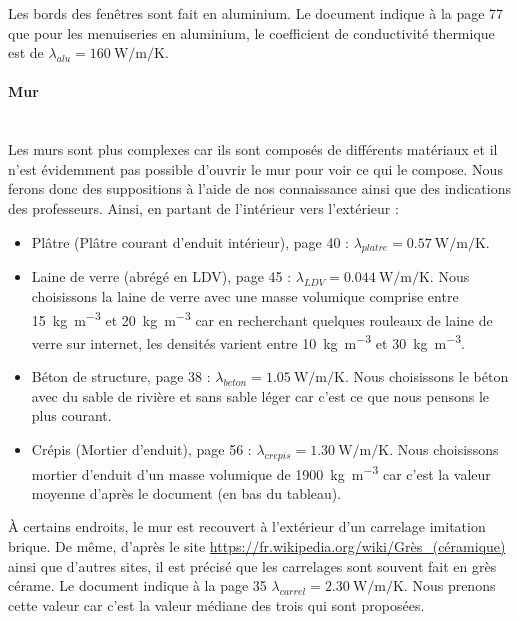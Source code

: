 \documentclass[12pt, a4paper]{article}
\newcommand{\lambdaAlu}{\ensuremath{\lambda_{alu}}}
\newcommand{\lambdaPlatre}{\ensuremath{\lambda_{platre}}}
\newcommand{\lambdaLDV}{\ensuremath{\lambda_{LDV}}}
\newcommand{\lambdaBeton}{\ensuremath{\lambda_{beton}}}
\newcommand{\lambdaCrepis}{\ensuremath{\lambda_{crepis}}}
\newcommand{\lambdaCarrel}{\ensuremath{\lambda_{carrel}}}
\begin{document}
Les bords des fenêtres sont fait en aluminium. Le document indique à la page 77 que pour les menuiseries en aluminium, le coefficient de conductivité thermique est de $\boxed{\lambdaAlu = \SI{160}{\watt\per\meter\per\kelvin}}$.

\paragraph{Mur} \phantom{.} \\

Les murs sont plus complexes car ils sont composés de différents matériaux et il n'est évidemment pas possible d'ouvrir le mur pour voir ce qui le compose. Nous ferons donc des suppositions à l'aide de nos connaissance ainsi que des indications des professeurs. Ainsi, en partant de l'intérieur vers l'extérieur :

\begin{itemize}
\item Plâtre (Plâtre courant d’enduit intérieur), page 40 : $\boxed{\lambdaPlatre = \SI{0.57}{\watt\per\meter\per\kelvin}}$.
\item Laine de verre (abrégé en LDV), page 45 : $\boxed{\lambdaLDV = \SI{0.044}{\watt\per\meter\per\kelvin}}$. Nous choisissons la laine de verre avec une masse volumique comprise entre \SI{15}{\kilo\gram\per\meter\cubed} et \SI{20}{\kilo\gram\per\meter\cubed} car en recherchant quelques rouleaux de laine de verre sur internet,  les densités varient entre \SI{10}{\kilo\gram\per\meter\cubed} et \SI{30}{\kilo\gram\per\meter\cubed}.
\item Béton de structure, page 38 : $\boxed{\lambdaBeton = \SI{1.05}{\watt\per\meter\per\kelvin}}$. Nous choisissons le béton avec du sable de rivière et sans sable léger car c'est ce que nous pensons le plus courant.
\item Crépis (Mortier d'enduit), page 56 : $\boxed{\lambdaCrepis = \SI{1.30}{\watt\per\meter\per\kelvin}}$. Nous choisissons mortier d'enduit d'un masse volumique de \SI{1900}{\kilo\gram\per\meter\cubed} car c'est la valeur moyenne d'après le document (en bas du tableau).
\end{itemize}

\bigskip

À certains endroits, le mur est recouvert à l'extérieur d'un carrelage imitation brique. De même, d'après le site \href{https://fr.wikipedia.org/wiki/Grès_(céramique)}{https://fr.wikipedia.org/wiki/Grès\_(céramique)} ainsi que d'autres sites, il est précisé que les carrelages sont souvent fait en grès cérame. Le document indique à la page 35 $\boxed{\lambdaCarrel = \SI{2.30}{\watt\per\meter\per\kelvin}}$. Nous prenons cette valeur car c'est la valeur médiane des trois qui sont proposées.
\end{document}

